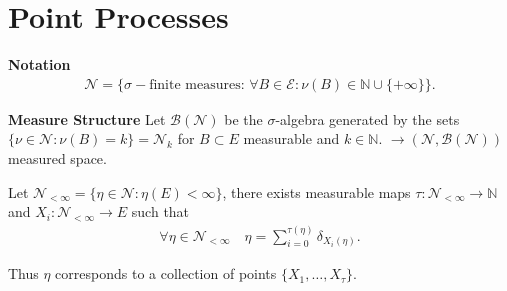 \section{Point Processes}
\textbf{Notation} 
\begin{align}
	\mathcal{N}=\{\sigma-\textrm{finite measures: } \forall B \in \mathcal{E}: \nu(B) \in \mathbb{N} \cup \{+\infty\}\}.
\end{align}

\noindent
\textbf{Measure Structure} Let $\mathcal{B}(\mathcal{N})$ be the $\sigma$-algebra generated by the sets $\{\nu \in \mathcal{N}: \nu(B)=k\}=\mathcal{N}_k$ for $B \subset E$ measurable and $k \in \mathbb{N}$. $\to (\mathcal{N}, \mathcal{B}(\mathcal{N}))$ measured space.

\begin{prop}
	Let $\mathcal{N}_{<\infty}=\{\eta \in \mathcal{N}: \eta(E)<\infty \}$, there exists measurable maps $\tau: \mathcal{N}_{< \infty} \to \mathbb{N}$ and $ X_i: \mathcal{N}_{< \infty} \to E$ such that 
	\begin{align}
		\forall \eta \in \mathcal{N}_{<\infty}\quad \eta = \sum_{i=0}^{\tau(\eta)} \delta_{X_i(\eta)}.
	\end{align}
\end{prop}
\begin{rmk}[]
	Thus $\eta$ corresponds to a collection of points $\{X_1, \ldots ,X_{\tau}\}$.
\end{rmk}
